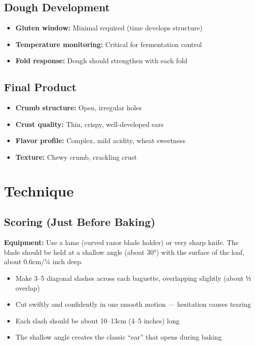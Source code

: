 \documentclass[10pt,a4paper]{article}
\begin{document}
    \subsection{Dough Development}
    \begin{itemize}[leftmargin=*]
        \item \textbf{Gluten window:} Minimal required (time develops structure)
        \item \textbf{Temperature monitoring:} Critical for fermentation control
        \item \textbf{Fold response:} Dough should strengthen with each fold
    \end{itemize}

    \subsection{Final Product}
    \begin{itemize}[leftmargin=*]
        \item \textbf{Crumb structure:} Open, irregular holes
        \item \textbf{Crust quality:} Thin, crispy, well-developed ears
        \item \textbf{Flavor profile:} Complex, mild acidity, wheat sweetness
        \item \textbf{Texture:} Chewy crumb, crackling crust
    \end{itemize}

    \section{Technique}

    \subsection{Scoring (Just Before Baking)}
    \textbf{Equipment:} Use a lame (curved razor blade holder) or very sharp knife. The blade should be held at a shallow angle (about 30°) with the surface of the loaf, about 0.6cm/¼ inch deep.

    \begin{itemize}[leftmargin=*]
        \item Make 3--5 diagonal slashes across each baguette, overlapping slightly (about ⅓ overlap)
        \item Cut swiftly and confidently in one smooth motion --- hesitation causes tearing
        \item Each slash should be about 10--13cm (4--5 inches) long
        \item The shallow angle creates the classic ``ear'' that opens during baking
    \end{itemize}
\end{document}
